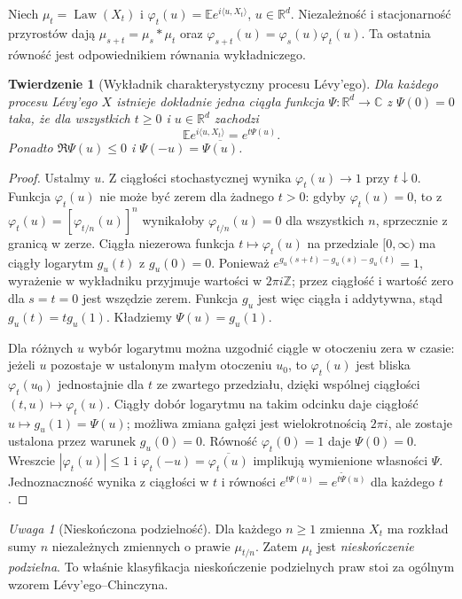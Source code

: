 \documentclass[11pt,a4paper,oneside]{report}
\numberwithin{equation}{chapter}
\theoremstyle{plain}
\newtheorem{twierdzenie}{Twierdzenie}[chapter]
\theoremstyle{definition}
\theoremstyle{remark}
\newtheorem{uwaga}{Uwaga}[chapter]
\newcommand{\R}{\mathbb{R}}
\newcommand{\Z}{\mathbb{Z}}
\newcommand{\E}{\mathbb{E}}
\newcommand{\Law}{\operatorname{Law}}
\begin{document}
Niech $\mu_t=\Law(X_t)$ i
$\varphi_t(u)=\E e^{i\langle u,X_t\rangle}$,
$u\in\R^d$. Niezależność i stacjonarność przyrostów dają
$\mu_{s+t}=\mu_s*\mu_t$ oraz
$\varphi_{s+t}(u)=\varphi_s(u)\varphi_t(u)$.
Ta ostatnia równość jest odpowiednikiem równania wykładniczego.

\begin{twierdzenie}[Wykładnik charakterystyczny procesu Lévy'ego]\label{thm:volIII:10:01}
\label{th:levy-exponent}
Dla każdego procesu Lévy'ego $X$ istnieje dokładnie jedna
ciągła funkcja $\Psi:\R^d\to\mathbb C$ z $\Psi(0)=0$
taka, że dla wszystkich $t\ge0$ i $u\in\R^d$ zachodzi
\[
\E e^{i\langle u,X_t\rangle}=e^{t\Psi(u)}.
\tag{10.1}\label{eq:levy-exponent}
\]
Ponadto $\Re\Psi(u)\le0$ i $\Psi(-u)=\overline{\Psi(u)}$.
\end{twierdzenie}
\begin{proof}
Ustalmy $u$. Z ciągłości stochastycznej wynika
$\varphi_t(u)\to1$ przy $t\downarrow0$.
Funkcja $\varphi_t(u)$ nie może być zerem dla żadnego $t>0$:
gdyby $\varphi_t(u)=0$, to z
$\varphi_t(u)=[\varphi_{t/n}(u)]^n$ wynikałoby
$\varphi_{t/n}(u)=0$ dla wszystkich $n$, sprzecznie z
granicą w zerze. Ciągła niezerowa funkcja
$t\mapsto\varphi_t(u)$ na przedziale $[0,\infty)$
ma ciągły logarytm $g_u(t)$ z $g_u(0)=0$.
Ponieważ $e^{g_u(s+t)-g_u(s)-g_u(t)}=1$,
wyrażenie w wykładniku przyjmuje wartości w $2\pi i\Z$;
przez ciągłość i wartość zero dla $s=t=0$ jest wszędzie zerem.
Funkcja $g_u$ jest więc ciągła i addytywna, stąd
$g_u(t)=t g_u(1)$. Kładziemy $\Psi(u)=g_u(1)$.

Dla różnych $u$ wybór logarytmu można uzgodnić ciągle
w otoczeniu zera w czasie: jeżeli $u$ pozostaje w ustalonym
małym otoczeniu $u_0$, to $\varphi_t(u)$ jest bliska
$\varphi_t(u_0)$ jednostajnie dla $t$ ze zwartego przedziału,
dzięki wspólnej ciągłości $(t,u)\mapsto\varphi_t(u)$.
Ciągły dobór logarytmu na takim odcinku daje ciągłość
$u\mapsto g_u(1)=\Psi(u)$; możliwa zmiana gałęzi jest
wielokrotnością $2\pi i$, ale zostaje ustalona przez
warunek $g_u(0)=0$. Równość $\varphi_t(0)=1$ daje
$\Psi(0)=0$. Wreszcie $|\varphi_t(u)|\le1$ i
$\varphi_t(-u)=\overline{\varphi_t(u)}$ implikują
wymienione własności $\Psi$.
Jednoznaczność wynika z ciągłości w $t$ i równości
$e^{t\Psi(u)}=e^{t\widetilde\Psi(u)}$ dla każdego $t$.
\end{proof}

\begin{uwaga}[Nieskończona podzielność]
Dla każdego $n\ge1$ zmienna $X_t$ ma rozkład sumy $n$
niezależnych zmiennych o prawie $\mu_{t/n}$.
Zatem $\mu_t$ jest \emph{nieskończenie podzielna}.
To właśnie klasyfikacja nieskończenie podzielnych praw
stoi za ogólnym wzorem Lévy'ego--Chinczyna.
\end{uwaga}
\end{document}
